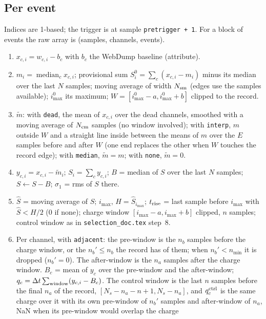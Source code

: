 \documentclass[11pt]{article}
\newcommand{\code}[1]{\texttt{#1}}
\begin{document}
\subsection{Per event}

Indices are 1-based; the trigger is at sample \code{pretrigger + 1}. For a
block of events the raw array is (samples, channels, events).

\begin{enumerate}
\item $x_{c,i} = w_{c,i} - b_c$ with $b_c$ the WebDump baseline (attribute).
\item $m_i = \operatorname{median}_c x_{c,i}$; provisional sum $S^0_i =
  \sum_c (x_{c,i} - m_i)$ minus its median over the last $N$ samples;
  moving average of width $N_{\rm sm}$ (edges use the samples available);
  $i^0_{\max}$ its maximum; $W = [i^0_{\max} - a, i^0_{\max} + b]$ clipped
  to the record.
\item $\tilde m$: with \code{dead}, the mean of $x_{c,i}$ over the dead
  channels, smoothed with a moving average of $N_{\rm cm}$ samples (no
  window involved); with \code{interp}, $m$ outside $W$ and a straight line
  inside between the means of $m$ over the $E$ samples before and after
  $W$ (one end replaces the other when $W$ touches the record edge); with
  \code{median}, $\tilde m = m$; with \code{none}, $\tilde m = 0$.
\item $y_{c,i} = x_{c,i} - \tilde m_i$; $S_i = \sum_c y_{c,i}$; $B$ =
  median of $S$ over the last $N$ samples; $S \leftarrow S - B$; $\sigma_1$
  = rms of $S$ there.
\item $\hat S$ = moving average of $S$; $i_{\max}$, $H = \hat S_{i_{\max}}$;
  $t_{\rm rise}$ = last sample before $i_{\max}$ with $\hat S < H/2$ (0 if
  none); charge window $[i_{\max} - a, i_{\max} + b]$ clipped, $n$ samples;
  control window as in \code{selection\_doc.tex} step~8.
\item Per channel, with \code{adjacent}: the pre-window is the $n_b$
  samples before the charge window, or the $n_b' \le n_b$ the record has
  of them; when $n_b' < n_{\min}$ it is dropped ($n_b' = 0$). The
  after-window is the $n_a$ samples after the charge window. $B_c$ = mean
  of $y_c$ over the pre-window and the after-window;
  $q_c = \Delta t \sum_{\rm window} (y_{c,i} - B_c)$. The control window
  is the last $n$ samples before the final $n_a$ of the record,
  $[N_s - n_a - n + 1, N_s - n_a]$, and $q_c^{\rm ctrl}$ is the same
  charge over it with its own pre-window of $n_b'$ samples and
  after-window of $n_a$, NaN when its pre-window would overlap the charge

\end{enumerate}
\end{document}
